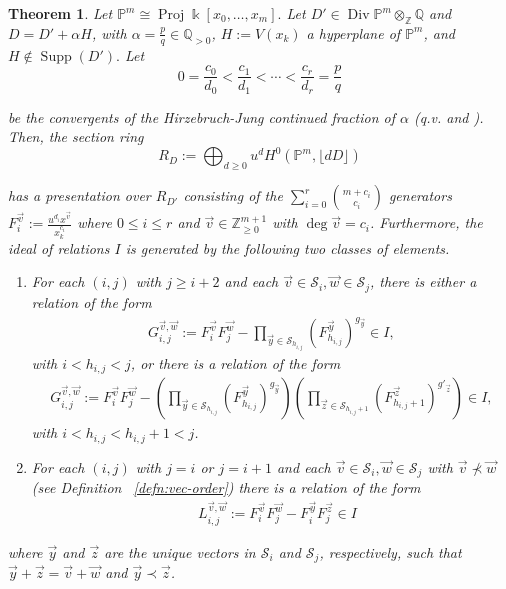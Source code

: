 \documentclass{amsart}
\theoremstyle{plain}
\newtheorem{thm}{Theorem}[subsection]
\theoremstyle{definition}
\theoremstyle{remark}
\numberwithin{equation}{section}
\newcommand\bq{{\mathbb Q}}
\newcommand\bp{{\mathbb P}}
\newcommand\bz{{\mathbb Z}}
\newcommand\bk{{\Bbbk}}
\DeclareMathOperator\di{Div}
\newcommand\mss{\mathscr{S}}
\DeclareMathOperator{\supp}{Supp}
\DeclareMathOperator{\proj}{Proj}
\begin{document}
\begin{thm}
\label{thm:proj-one-point}
Let $\bp^m \cong \proj \bk [x_0, \ldots, x_m].$ Let $D' \in \di \bp^m \otimes_\bz \bq$ and $D = D' + \alpha H$, with $\alpha =
\frac{p}{q} \in \bq_{>0}$, $H := V(x_k)$ a hyperplane of $\bp^m$,
and $H \notin \supp(D').$
Let
\[
	0 = \frac{c_0}{d_0} <
	\frac{c_1}{d_1} < \cdots < \frac{c_r}{d_r} = \frac{p}{q}
\]

\noindent
be the convergents of the Hirzebruch-Jung continued fraction of
$\alpha$ {\rm(}q.v. \cite[Section 2]{voight:cf} and
\cite[Section 3]{hirzebruch:cf}{\rm)}. Then, the section ring
\[
	R_D := \bigoplus_{d \geq 0} u^d H^0(\bp^m, \lfloor dD \rfloor)
\]

\noindent
has a presentation over $R_{D'}$ consisting of the $\sum_{i = 0}^{r}
{{m + c_i} \choose {c_i}}$ generators $F_i^{\vec{v}} := \frac{u^{d_i}
x^{\vec{v}}}{x_k^{c_i}}$ where $0 \leq i \leq r$ and $\vec{v} \in \bz_{\geq 0}^{m + 1}$
with $\deg \vec v = c_i$. Furthermore, the ideal of
relations $I$ is generated by the following two classes of elements.
\begin{enumerate}
	\item For each $(i, j)$ with $j \geq i + 2$ and each $\vec{v} \in \mss_i,
		\vec{w} \in \mss_j$, there is either a relation of the form
		\begin{align*}
			G_{i, j}^{\vec{v}, \vec{w}} := F_i^{\vec{v}} F_j^{\vec{w}}
			- \prod_{\vec{y} \in \mss_{h_{i, j}}} (F_{h_{i, j}}^{\vec{y}})
			^{g_{\vec{y}}} \in I,
		\end{align*}
		with $i < h_{i, j} < j$, or there is a relation of the form
		\begin{align*}
			G_{i, j}^{\vec{v}, \vec{w}} := F_i^{\vec{v}} F_j^{\vec{w}}
			- \left( \prod_{\vec{y} \in \mss_{h_{i, j}}} (F_{h_{i, j}}^{\vec{y}})^{g_{\vec{y}}}
			\right) \left( \prod_{ \vec{z} \in
			\mss_{h_{i, j} + 1}} (F_{h_{i, j} + 1}^{\vec{z}})^{g'_{\vec{z}}} \right) \in I,
		\end{align*}
		with $i < h_{i, j} < h_{i, j} + 1 < j$.
	\item For each $(i, j)$ with
		$j = i$ or $j = i + 1$ and each $\vec{v} \in \mss_i, \vec{w} \in
		\mss_j$ with $\vec{v} \not\prec \vec{w}$ (see Definition
		~\ref{defn:vec-order}) there is a relation of the form
		\begin{align*}
			&L_{i, j}^{\vec{v}, \vec{w}} := F_i^{\vec{v}} F_j^{\vec{w}}
			- F_i^{\vec{y}} F_j^{\vec{z}} \in I
		\end{align*}

\end{enumerate}

\noindent
where $\vec{y}$ and $\vec{z}$ are the unique
vectors in $\mss_i$ and $\mss_j$, respectively, such that $\vec{y}
+ \vec{z} = \vec{v} + \vec{w}$ and $\vec{y} \prec \vec{z}$.
\end{thm}
\end{document}
